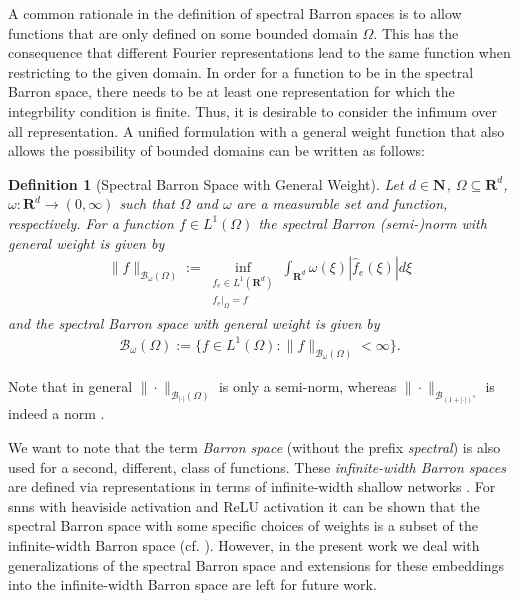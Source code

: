 \documentclass[a4paper]{article}
\newcommand{\nn}[1]{\mathbf{N}^{#1}}
\newcommand{\rr}[1]{\mathbf{R}^{#1}}
\newcommand{\abs}[1]{| #1|}     %
\newcommand{\norm}[2]{\|#1\|_{#2}}
\numberwithin{equation}{section}
\newtheorem{definition}[theorem]{Definition}
\theoremstyle{remark}
\begin{document}
A common rationale in the definition of spectral Barron spaces
is to allow functions that are only defined on some bounded domain $\Omega$.
This has the consequence that different Fourier representations
lead to the same function when restricting to the given domain.
In order for a function to be in the spectral Barron space,
there needs to be at least one representation for which the integrbility condition is finite.
Thus, it is desirable to consider the infimum over all representation.
A unified formulation with a general weight function
that also allows the possibility of bounded domains can be written as follows:
\begin{definition}[Spectral Barron Space with General Weight]
\label{def:spectral_Barron_space}
    Let $d\in\nn{}$, $\Omega\subseteq\rr{d}$, $\omega:\rr{d}\to (0,\infty)$ such that $\Omega$ and $\omega$ are a measurable set and function, respectively.
    For a function
    $f\in L^1(\Omega)$
    the spectral Barron (semi-)norm with general weight is given by
    \begin{align*}
        \norm{f}{\mathscr{B}_{\omega}(\Omega)}:=\inf_{\substack{f_e\in L^1(\rr{d})\\f_e|_\Omega=f}}\int_{\rr{d}}\omega(\xi)\abs{\hat{f}_e(\xi)}d\xi
    \end{align*}
    and the spectral Barron space with general weight is given by
    \begin{align*}
        \mathscr{B}_{\omega}(\Omega):=\{f\in L^1(\Omega):\norm{f}{\mathscr{B}_{\omega}(\Omega)}<\infty\}.
    \end{align*}
\end{definition}
Note that in general $\norm{\cdot}{\mathscr{B}_{\abs{\cdot}}(\Omega)}$ is
only a semi-norm,
whereas $\norm{\cdot}{\mathscr{B}_{(1+\abs{\cdot})^s}}$ is indeed a norm \cite{Siegel22SharpBoundsApproximation}.



We want to note that the term
\emph{Barron space} (without the prefix \emph{spectral}) is also used for a second, different,
class of functions.
These \emph{infinite-width Barron spaces} are defined via representations 
in terms of infinite-width shallow networks
\cite{Caragea23NeuralNetworkApproximation,Li20ComplexityMeasuresNeural,E22BarronSpaceFlowInduced}.
For \glspl{snn} with heaviside activation and ReLU activation
it can be shown that the spectral Barron space
with some specific choices of weights
is a subset of the infinite-width Barron space (cf. \cite[Lemma 7.1]{Caragea23NeuralNetworkApproximation}).
However, in the present work we deal with generalizations
of the spectral Barron space and extensions for these embeddings
into the infinite-width Barron space are left for future work.
\end{document}
